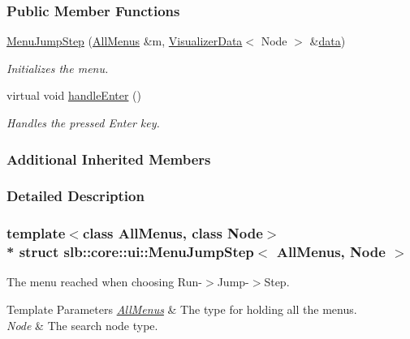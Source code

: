 \subsubsection*{Public Member Functions}
\begin{DoxyCompactItemize}
\item 
\hyperlink{structslb_1_1core_1_1ui_1_1MenuJumpStep_a3f386a9b2c88131089a3f90e382bac6d}{Menu\+Jump\+Step} (\hyperlink{structslb_1_1core_1_1ui_1_1AllMenus}{All\+Menus} \&m, \hyperlink{structslb_1_1core_1_1ui_1_1VisualizerData}{Visualizer\+Data}$<$ Node $>$ \&\hyperlink{structslb_1_1core_1_1ui_1_1MenuBase_a475d9457affb2b4fc96737e269d6911f}{data})
\begin{DoxyCompactList}\small\item\em Initializes the menu. \end{DoxyCompactList}\item 
virtual void \hyperlink{structslb_1_1core_1_1ui_1_1MenuJumpStep_a96e83f4d08b7be93477a0d5d294faf81}{handle\+Enter} ()\hypertarget{structslb_1_1core_1_1ui_1_1MenuJumpStep_a96e83f4d08b7be93477a0d5d294faf81}{}\label{structslb_1_1core_1_1ui_1_1MenuJumpStep_a96e83f4d08b7be93477a0d5d294faf81}

\begin{DoxyCompactList}\small\item\em Handles the pressed Enter key. \end{DoxyCompactList}\end{DoxyCompactItemize}
\subsubsection*{Additional Inherited Members}


\subsubsection{Detailed Description}
\subsubsection*{template$<$class All\+Menus, class Node$>$\\*
struct slb\+::core\+::ui\+::\+Menu\+Jump\+Step$<$ All\+Menus, Node $>$}

The menu reached when choosing Run-\/$>$Jump-\/$>$Step. 


\begin{DoxyTemplParams}{Template Parameters}
{\em \hyperlink{structslb_1_1core_1_1ui_1_1AllMenus}{All\+Menus}} & The type for holding all the menus. \\
\hline
{\em Node} & The search node type. \\
\hline
\end{DoxyTemplParams}


